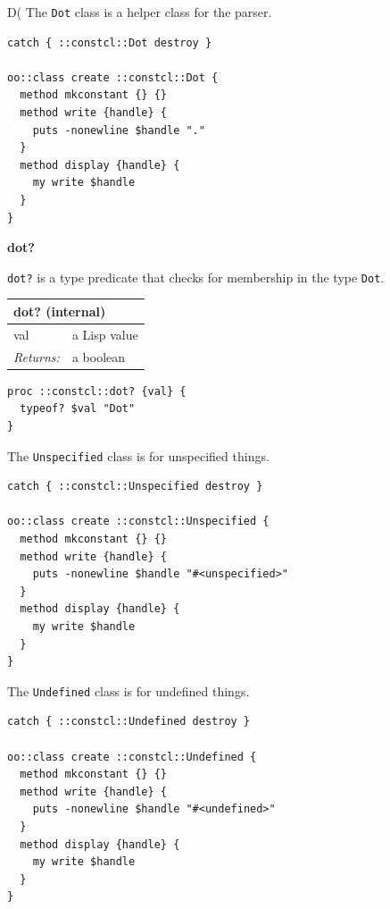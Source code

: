 \documentclass[twoside,9pt]{report}
\begin{document}
D( The \texttt{Dot} class is a helper class for the parser.

\noindent\makebox[\linewidth]{\rule{\linewidth}{0.4pt}}
\begin{lstlisting}
catch { ::constcl::Dot destroy }
 
oo::class create ::constcl::Dot {
  method mkconstant {} {}
  method write {handle} {
    puts -nonewline $handle "."
  }
  method display {handle} {
    my write $handle
  }
}
\end{lstlisting}
\noindent\makebox[\linewidth]{\rule{\linewidth}{0.4pt}}

\textbf{dot?}


\texttt{dot?} is a type predicate that checks for membership in the type \texttt{Dot}.

\begin{tabular}{ |l l| }
\hline
\multicolumn{2}{|l|}{dot? (internal)} \\
\hline
val & a Lisp value \\
\textit{Returns:} & a boolean \\
\hline
\end{tabular}

\noindent\makebox[\linewidth]{\rule{\linewidth}{0.4pt}}
\begin{lstlisting}
proc ::constcl::dot? {val} {
  typeof? $val "Dot"
}
\end{lstlisting}
\noindent\makebox[\linewidth]{\rule{\linewidth}{0.4pt}}

The \texttt{Unspecified} class is for unspecified things.

\noindent\makebox[\linewidth]{\rule{\linewidth}{0.4pt}}
\begin{lstlisting}
catch { ::constcl::Unspecified destroy }
 
oo::class create ::constcl::Unspecified {
  method mkconstant {} {}
  method write {handle} {
    puts -nonewline $handle "#<unspecified>"
  }
  method display {handle} {
    my write $handle
  }
}
\end{lstlisting}
\noindent\makebox[\linewidth]{\rule{\linewidth}{0.4pt}}

The \texttt{Undefined} class is for undefined things.

\noindent\makebox[\linewidth]{\rule{\linewidth}{0.4pt}}
\begin{lstlisting}
catch { ::constcl::Undefined destroy }
 
oo::class create ::constcl::Undefined {
  method mkconstant {} {}
  method write {handle} {
    puts -nonewline $handle "#<undefined>"
  }
  method display {handle} {
    my write $handle
  }
}
\end{lstlisting}
\noindent\makebox[\linewidth]{\rule{\linewidth}{0.4pt}}
\end{document}
